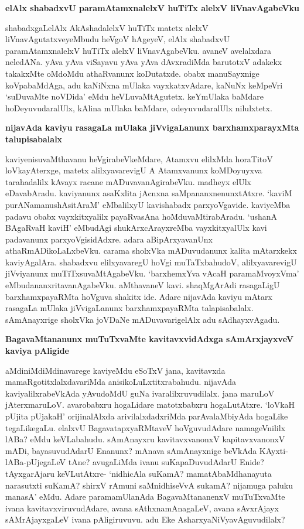 \noindent
{\bf\large{elAlx shabadxvU paramAtamxnalelxV huTiTx alelxV liVnavAgabeVku}}\label{page182}

shabadxgaLelAlx AkAshadalelxV huTiTx matetx alelxV liVnavAgutatxveyeMbudu heVgoV hAgeyeV, elAlx shabadxvU paramAtamxnalelxV huTiTx alelxV liVnavAgabeVku. avaneV avelalxdara neledANa. yAva yAva viSayavu yAva yAva dAvxradiMda barutotxV adakekx takakxMte oMdoMdu athaRvanunx koDutatxde. obabx manuSayxnige koVpabaMdAga, adu kaNiNxna mUlaka vayxkatxvAdare, kaNuNx keMpeVri `suDuvaMte noVDida' eMdu heVLuvaMtAgutetx. keYmUlaka baMdare hoDeyuvudaralUlx, kAlina mUlaka baMdare, odeyuvudaralUlx nilulxtetx. 

\noindent
{\bf\large{nijavAda kaviyu rasagaLa mUlaka jiVvigaLanunx barxhamxparayxMta talupisabalalx}}\label{page183}

kaviyenisuvaMthavanu heVgirabeVkeMdare, Atamxvu elilxMda horaTitoV loVkayAterxge, matetx alilxyavarevigU A Atamxvanunx koMDoyuyxva tarahadalilx kAvayx racane mADuvavanAgirabeVku. madheyx elUlx eDavabAradu. kaviyanunx asaKxlita jAcnxna saMpananxnenunxtAtxre. `kaviM purANamanushAsitAraM'\label{239} eMbalilxyU kavishabadx parxyoVgavide. kaviyeMba padavu obabx vayxkitxyalilx payaRvasAna hoMduvaMtirabAradu. `ushanA BAgaRvaH kaviH' eMbudAgi shukArxcArayxreMba vayxkitxyalUlx kavi padavanunx parxyoVgisidAdxre. adara aBipArxyavanUnx athaRmADikoLaLxbeVku. carama sholxVka mADuvudanunx kalita mAtarxkekx kaviyAgalAra. shabadxvu elilxyavaregU hoVgi muTaTxbahudoV, alilxyavarevigU jiVviyanunx muTiTxsuvaMtAgabeVku. `barxhemxYva vAcaH paramaMvoyxVma'\label{183} eMbudananxritavanAgabeVku. aMthavaneV kavi. shaqMgArAdi rasagaLigU barxhamxpayaRMta hoVguva shakitx ide. Adare nijavAda kaviyu mAtarx rasagaLa mUlaka jiVvigaLanunx barxhamxpayaRMta talapisabalalx. sAmAnayxrige sholxVka joVDaNe mADuvavarigelAlx adu sAdhayxvAgadu.

\noindent
{\bf\large{BagavaMtananunx muTuTxvaMte kavitavxvidAdxga sAmArxjayxveV kaviya pAligide}}\label{page183}

aMdiniMdiMdinavarege kaviyeMdu eSoTxV jana, kavitavxda mamaRgotitxlalxdavariMda anisikoLuLxtitxrabahudu. nijavAda kaviyalilxrabeVkAda yAvudoMdU guNa ivaralilxruvudilalx. jana maruLoV jAterxmaruLoV. avarobabxru hogaLidare matotxbabxru hogaLutAtxre. `loVkaH pUjita pUjakaH'\label{183} orijinalAlxda arivilalxdadxriMda parAvalaMbiyAda hogaLike tegaLikegaLu. elalxvU BagavatapxyaRMtaveV hoVguvudAdare namageVnililx lABa? eMdu keVLabahudu. sAmAnayxru kavitavxvanonxV kapitavxvanonxV mADi, bayasuvudAdarU Enanunx? mAnava sAmAnayxnige beVkAda KAyxti-lABa-pUjegaLeV tAne? avugaLiMda ivanu suKapaDuvudAdarU Enide? tAyxgarAjaru keVLutAtxre- `nidhicAla suKamA? mamatAbaMdhanayuta narasutxti suKamA? shirxV rAmuni saMnidhiseVvA sukamA? nijamuga paluku manasA' eMdu. Adare paramamUlanAda BagavaMtananenxV muTuTxvaMte ivana kavitavxviruvudAdare, avana sAthxnamAnagaLeV, avana sAvxrAjayx sAMrAjayxgaLeV ivana pAligiruvuvu. adu Eke AsharxyaNiVyavAguvudilalx?

